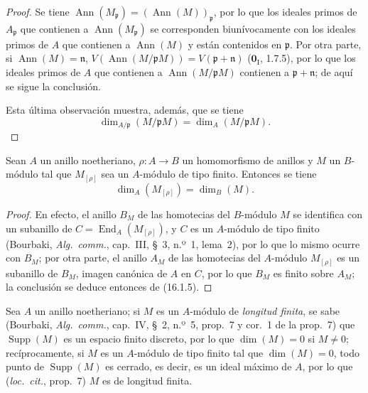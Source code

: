 \begin{proof}
Se tiene
$\operatorname{Ann}(M_{\mathfrak{p}})=(\operatorname{Ann}(M))_{\mathfrak{p}}$,
por lo que los ideales primos de $A_{\mathfrak{p}}$ que contienen a
$\operatorname{Ann}(M_{\mathfrak{p}})$ se corresponden biunívocamente con los
ideales primos de $A$ que contienen a $\operatorname{Ann}(M)$ y están
contenidos en $\mathfrak{p}$. Por otra parte, si
$\operatorname{Ann}(M)=\mathfrak{n}$,
$V(\operatorname{Ann}(M/\mathfrak{p}M))=V(\mathfrak{p}+\mathfrak{n})$
($\mathbf{0}_{\mathrm I}$, 1.7.5), por lo que los ideales primos de $A$ que contienen a
$\operatorname{Ann}(M/\mathfrak{p}M)$ contienen a
$\mathfrak{p}+\mathfrak{n}$; de aquí se sigue la conclusión.

Esta última observación muestra, además, que se tiene
\[
\label{0.16.1.8.2-fr}
  \dim_{A/\mathfrak{p}}(M/\mathfrak{p}M)=\dim_A(M/\mathfrak{p}M).
\tag{16.1.8.2}
\]
\end{proof}

\begin{proposition}[16.1.9]
\label{0.16.1.9-fr}
Sean $A$ un anillo noetheriano, $\rho:A\to B$ un homomorfismo de anillos y $M$
un $B$-módulo tal que $M_{[\rho]}$ sea un $A$-módulo de tipo finito. Entonces
se tiene
\[
\label{0.16.1.9.1-fr}
  \dim_A(M_{[\rho]})=\dim_B(M).
\tag{16.1.9.1}
\]
\end{proposition}

\begin{proof}
En efecto, el anillo $B_M$ de las homotecias del $B$-módulo $M$ se identifica
con un subanillo de $C=\operatorname{End}_A(M_{[\rho]})$, y $C$ es un
$A$-módulo de tipo finito (Bourbaki, \emph{Alg.~comm.}, cap.~III, \S~3,
n.º~1, lema~2), por lo que lo mismo ocurre con $B_M$; por otra parte, el
anillo $A_M$ de las homotecias del $A$-módulo $M_{[\rho]}$ es un subanillo de
$B_M$, imagen canónica de $A$ en $C$, por lo que $B_M$ es finito sobre $A_M$;
la conclusión se deduce entonces de (16.1.5).
\end{proof}

\begin{env}[16.1.10]
\label{0.16.1.10-fr}
Sea $A$ un anillo noetheriano; si $M$ es un $A$-módulo de \emph{longitud finita}, se
sabe (Bourbaki, \emph{Alg.~comm.}, cap.~IV, \S~2, n.º~5, prop.~7 y cor.~1 de
la prop.~7) que $\operatorname{Supp}(M)$ es un espacio finito discreto, por lo
que $\dim(M)=0$ si $M\neq0$; recíprocamente, si $M$ es un $A$-módulo de tipo
finito tal que $\dim(M)=0$, todo punto de $\operatorname{Supp}(M)$ es cerrado,
es decir, es un ideal máximo de $A$, por lo que (\emph{loc.~cit.}, prop.~7)
$M$ es de longitud finita.
\end{env}
